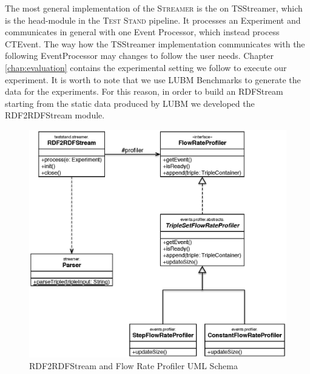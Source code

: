 The most general implementation of the \textsc{Streamer} is the on TSStreamer, which is the head-module in the \textsc{Test Stand} pipeline. It processes an Experiment and communicates in general with one Event Processor, which instead process CTEvent. The way  how the TSStreamer implementation communicates with the following EventProcessor may changes to follow the user needs. 
Chapter \ref{chap:evaluation} contains the experimental setting we follow to execute our experiment. It is worth to note that we use LUBM Benchmarks to generate the data for the experiments. For this reason, in order to build an RDFStream starting from the static data produced by LUBM we developed the RDF2RDFStream module.

\begin{figure}[tbh]
  \centering
	\includegraphics[width=\linewidth]{images/uml_flowrateprofiler}
	\caption{RDF2RDFStream and Flow Rate Profiler UML Schema} 
  	\label{fig:flowrateprofiler}
\end{figure}


